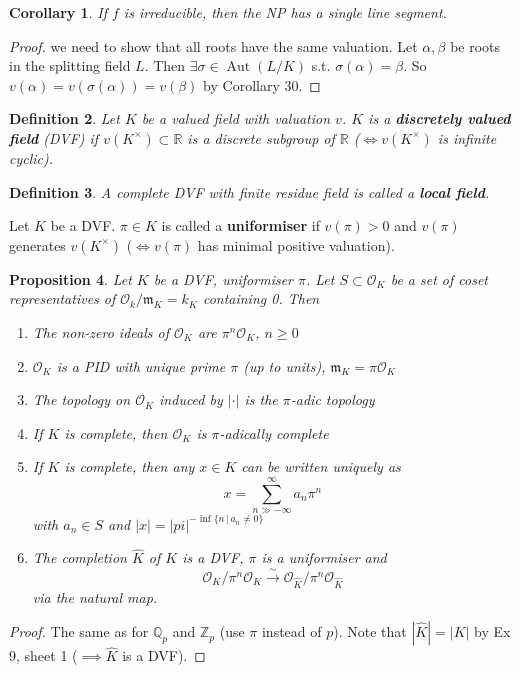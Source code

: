 \documentclass[a4paper]{article}
\newtheorem{definition}{Definition}
\newtheorem{prop}[definition]{Proposition}
\newtheorem{corollary}[definition]{Corollary}
\newcommand*\abs[1]{\left|#1\right|}
\DeclareMathOperator{\Aut}{Aut}
\begin{document}
\begin{corollary}
	If $f$ is irreducible, then the NP has a single line segment.
\end{corollary}
\begin{proof}
	we need to show that all roots have the same valuation. Let $\alpha, \beta$ be roots in the splitting field $L$. Then $\exists \sigma \in \Aut(L/K)$ s.t. $\sigma(\alpha) = \beta$. So $v(\alpha)=v(\sigma(\alpha))=v(\beta)$ by Corollary 30.
\end{proof}

\begin{definition}
	Let $K$ be a valued field with valuation $v$. $K$ is a \textbf{discretely valued field} (DVF) if $v(K^\times)\subset \mathbb{R}$ is a discrete subgroup of $\mathbb{R}$ ($\iff v(K^\times)$ is infinite cyclic).
\end{definition}

\begin{definition}
	A complete DVF with finite residue field is called a \textbf{local field}.
\end{definition}

Let $K$ be a DVF. $\pi \in K$ is called a \textbf{uniformiser} if $v(\pi) > 0$ and $v(\pi)$ generates $v(K^\times)$ ($\iff v(\pi)$ has minimal positive valuation).

\begin{prop}
	Let $K$ be a DVF, uniformiser $\pi$. Let $S \subset \mathcal{O}_K$ be a set of coset representatives of $\mathcal{O}_k/\mathfrak{m}_K = k_K$ containing 0. Then
	\begin{enumerate}
		\item The non-zero ideals of $\mathcal{O}_K$ are $\pi^n\mathcal{O}_K$, $n \geq 0$
		\item $\mathcal{O}_K$ is a PID with unique prime $\pi$ (up to units), $\mathfrak{m}_K=\pi\mathcal{O}_K$
		\item The topology on $\mathcal{O}_K$ induced by $\abs{\cdot}$ is the $\pi$-adic topology
		\item If $K$ is complete, then $\mathcal{O}_K$ is $\pi$-adically complete
		\item If $K$ is complete, then any $x \in K$ can be written uniquely as
		$$ x = \sum_{n \gg -\infty}^{\infty} a_n \pi^n$$
		with $a_n \in S$ and $\abs{x} = \abs{pi}^{-\inf\{n \,|\, a_n \neq 0\}}$
		\item The completion $\hat{K}$ of $K$ is a DVF, $\pi$ is a uniformiser and 
		$$\mathcal{O}_K/\pi^n\mathcal{O}_K \overset{\sim}{\to} \mathcal{O}_{\hat{K}}/\pi^n\mathcal{O}_{\hat{K}}$$
		via the natural map.
	\end{enumerate}
\end{prop}
\begin{proof}
	The same as for $\mathbb{Q}_p$ and $\mathbb{Z}_p$ (use $\pi$ instead of $p$). 
	Note that $\abs{\hat{K}} = \abs{K}$ by Ex 9, sheet 1 ($\implies \hat{K}$ is a DVF).
\end{proof}
\end{document}
